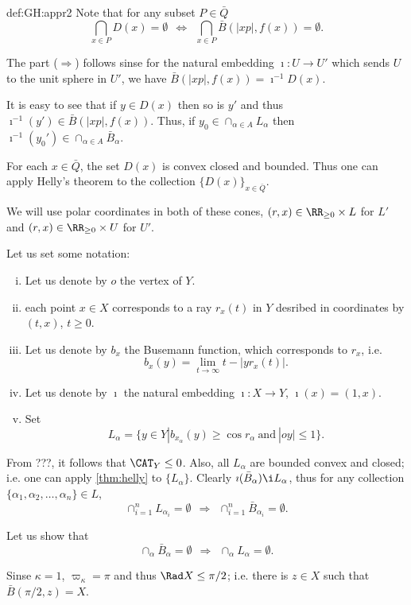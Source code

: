 {\begin{subthm}{def:GH:appr2}
Note that for any subset $P\in\bar Q$
$$\bigcap_{x\in P} D(x)=\emptyset 
\ \ 
\Longleftrightarrow
\ \ 
\bigcap_{x\in P} \bar B(|xp|,f(x))=\emptyset.$$

The part ($\Rightarrow$) follows sinse for the natural embedding $\imath:U\to U'$ which sends $U$ to the unit sphere in $U'$, we have $\bar B(|xp|,f(x))=\imath^{-1}D(x)$.
 

It is easy to see that if $y\in D(x)$ then so is
$y'$ and thus $\imath^{-1}(y')\in \bar B(|xp|,f(x))$.
Thus, if $y_0\in \cap_{\alpha\in A} L_\alpha$ then 
$\imath^{-1}(y_0')\in \cap_{\alpha\in A} \bar B_\alpha$.

For each $x\in \bar Q$, the set $D(x)$ is convex closed and bounded. 
Thus one can apply Helly's theorem to the collection $\{D(x)\}_{x\in \bar Q}$.

We will use polar coordinates in both of these cones,
$(r,x)\in\RR_{\ge0}\times L$ for $L'$ and 
$(r,x)\in\RR_{\ge0}\times U$ for $U'$.

 
Let us set some notation:
\begin{enumerate}[(i)]
\item Let us denote by $o$ the vertex of $Y$.
\item each point $x\in X$ corresponds to a ray
$r_x(t)$ in $Y$ desribed in coordinates by $(t,x)$, $t\ge 0$.
\item Let us denote by $b_x$ the Busemann function, which corresponds to $r_x$, i.e.
$$b_x(y)=\lim_{t\to\infty}t-|yr_x(t)|.$$
\item Let us denote by $\imath$ the natural embedding $\imath:X\to Y$, 
$\imath(x)=(1,x)$.
\item Set
$$L_\alpha=\{y\in Y|b_{x_\alpha}(y)\ge \cos r_\alpha\ \text{and}\  |oy|\le 1\}.$$
\end{enumerate} 

From ???, it follows that $\CAT_Y\le 0$.
Also, all $L_\alpha$ are bounded convex and closed;
i.e. one can apply \ref{thm:helly} to $\{L_\alpha\}$.
Clearly $\imath(\bar B_\alpha)\i L_\alpha$, thus for any collection
$\{\alpha_1,\alpha_2,\dots,\alpha_n\}\in L$,
$$\cap_{i=1}^n L_{\alpha_i}=\emptyset 
\ \ 
\Longrightarrow
\ \ 
\cap_{i=1}^n \bar B_{\alpha_i}=\emptyset.$$

Let us show that 
$$\cap_\alpha \bar B_\alpha=\emptyset 
\ \ 
\Longrightarrow
\ \ 
\cap_\alpha L_\alpha=\emptyset.$$

Sinse $\kappa=1$, $\varpi_\kappa=\pi$ and thus $\Rad X\le\pi/2$; 
i.e. there is $z\in X$ such that $\bar B(\pi/2,z)=X$. 



\end{subthm}}
